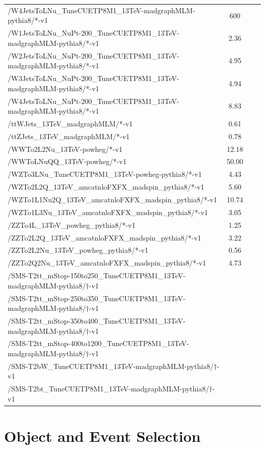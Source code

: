 \begin{table}[htp]
{\begin{tabular}{|l|c|c|c|}
/W4JetsToLNu\_TuneCUETP8M1\_13TeV-madgraphMLM-pythia8/*-v1 & 600 \\
/W1JetsToLNu\_NuPt-200\_TuneCUETP8M1\_13TeV-madgraphMLM-pythia8/*-v1 & 2.36  \\
/W2JetsToLNu\_NuPt-200\_TuneCUETP8M1\_13TeV-madgraphMLM-pythia8/*-v1 & 4.95 \\
/W3JetsToLNu\_NuPt-200\_TuneCUETP8M1\_13TeV-madgraphMLM-pythia8/*-v1 & 4.94 \\
/W4JetsToLNu\_NuPt-200\_TuneCUETP8M1\_13TeV-madgraphMLM-pythia8/*-v1 & 8.83 \\
/ttWJets\_13TeV\_madgraphMLM/*-v1 & 0.61 \\
/ttZJets\_13TeV\_madgraphMLM/*-v1 & 0.78 \\
/WWTo2L2Nu\_13TeV-powheg/*-v1 & 12.18 \\
/WWToLNuQQ\_13TeV-powheg/*-v1 & 50.00  \\
/WZTo3LNu\_TuneCUETP8M1\_13TeV-powheg-pythia8/*-v1 & 4.43 \\
/WZTo2L2Q\_13TeV\_amcatnloFXFX\_madspin\_pythia8/*-v1 & 5.60 \\
/WZTo1L1Nu2Q\_13TeV\_amcatnloFXFX\_madspin\_pythia8/*-v1 & 10.74 \\
/WZTo1L3Nu\_13TeV\_amcatnloFXFX\_madspin\_pythia8/*-v1 & 3.05 \\
/ZZTo4L\_13TeV\_powheg\_pythia8/*-v1 & 1.25 \\
/ZZTo2L2Q\_13TeV\_amcatnloFXFX\_madspin\_pythia8/*-v1 & 3.22 \\
/ZZTo2L2Nu\_13TeV\_powheg\_pythia8/*-v1 & 0.56 \\
/ZZTo2Q2Nu\_13TeV\_amcatnloFXFX\_madspin\_pythia8/*-v1 & 4.73 \\
/SMS-T2tt\_mStop-150to250\_TuneCUETP8M1\_13TeV-madgraphMLM-pythia8/$\dagger$-v1 & \\
/SMS-T2tt\_mStop-250to350\_TuneCUETP8M1\_13TeV-madgraphMLM-pythia8/$\dagger$-v1 & \\
/SMS-T2tt\_mStop-350to400\_TuneCUETP8M1\_13TeV-madgraphMLM-pythia8/$\dagger$-v1 & \\
/SMS-T2tt\_mStop-400to1200\_TuneCUETP8M1\_13TeV-madgraphMLM-pythia8/$\dagger$-v1 & \\
/SMS-T2bW\_TuneCUETP8M1\_13TeV-madgraphMLM-pythia8/$\dagger$-v1 & \\
/SMS-T2bt\_TuneCUETP8M1\_13TeV-madgraphMLM-pythia8/$\dagger$-v1 & \\
\hline
\end{tabular}
}
\end{table}

\section{Object and Event Selection}
\label{sec:stop:selections}

